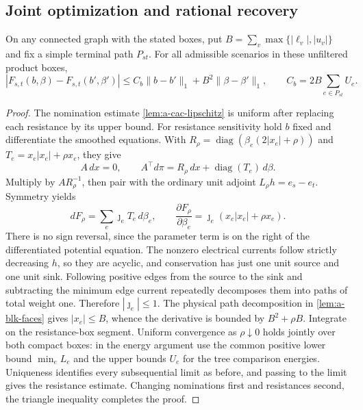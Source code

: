 \subsection{Joint optimization and rational recovery}
\begin{lemma}
\label{lem:a-blk-resistance-lipschitz}
On any connected graph with the stated boxes, put
$B=\sum_v\max\{|\ell_v|,|u_v|\}$ and fix a simple terminal path $P_{st}$.
For all admissible scenarios in these unfiltered product boxes,
\[
 |F_{s,t}(b,\beta)-F_{s,t}(b',\beta')|
 \le C_b\|b-b'\|_1+B^2\|\beta-\beta'\|_1,
 \qquad C_b=2B\sum_{e\in P_{st}}U_e.
\]
\end{lemma}
\begin{proof}
The nomination estimate \cref{lem:a-cac-lipschitz} is uniform after
replacing each resistance by its upper bound. For resistance sensitivity
hold $b$ fixed and differentiate the smoothed equations. With
$R_\rho=\operatorname{diag}(\beta_e(2|x_e|+\rho))$ and
$T_e=x_e|x_e|+\rho x_e$, they give
\[
 A\,dx=0,\qquad A^\top d\pi=R_\rho\,dx+
                       \operatorname{diag}(T_e)\,d\beta.
\]
Multiply by $AR_\rho^{-1}$, then pair with the ordinary unit adjoint
$L_\rho h=e_s-e_t$. Symmetry yields
\[
 dF_\rho=\sum_e\jmath_e T_e\,d\beta_e,
 \qquad \frac{\partial F_\rho}{\partial\beta_e}
          =\jmath_e(x_e|x_e|+\rho x_e).
\]
There is no sign reversal, since the parameter term is on the right of
the differentiated potential equation. The nonzero electrical currents
follow strictly decreasing $h$, so they are acyclic, and conservation
has just one unit source and one unit sink. Following positive edges from the
source to the sink and subtracting the minimum edge current repeatedly
decomposes them into paths of total weight one. Therefore
$|\jmath_e|\le1$. The physical path decomposition in
\cref{lem:a-blk-faces} gives $|x_e|\le B$, whence the derivative is
bounded by $B^2+\rho B$.
Integrate on the resistance-box segment. Uniform convergence as
$\rho\downarrow0$ holds jointly over both compact boxes: in the energy
argument use the common positive lower bound $\min_e L_e$ and the
upper bounds $U_e$ for the tree comparison energies. Uniqueness
identifies every subsequential limit as before, and passing to the
limit gives the resistance estimate. Changing nominations first and
resistances second, the triangle inequality completes the proof.
\end{proof}


